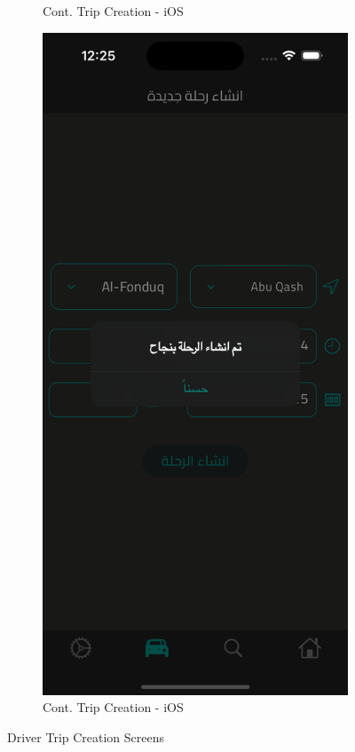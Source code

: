 \documentclass[a4paper, 12pt]{report} %
\begin{document}
\begin{figure}[H]
\begin{subfigure}{0.3\textwidth}
                    \caption{Cont. Trip Creation - iOS}
                    \label{fig:trip_cration_2}
                \end{subfigure}
                \begin{subfigure}{0.3\textwidth}
                    \includegraphics[width=\linewidth]{Images/trip_creation_3.png}  
                    \caption{Cont. Trip Creation - iOS}
                    \label{fig:trip_cration_3}
                \end{subfigure}
                \caption{Driver Trip Creation Screens}
                \label{fig:trip_creation}
            \end{figure}
        
\end{document}
